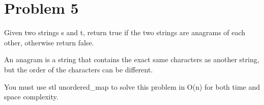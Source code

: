 \documentclass[a4paper]{article}
\begin{document}
\section*{Problem 5}
Given two strings s and t, return true if the two strings are anagrams of each other, otherwise return false.

An anagram is a string that contains the exact same characters as another string, but the order of the characters can be different.

You must use stl unordered\_map to solve this problem in O(n) for both time and space complexity. 
\end{document}
